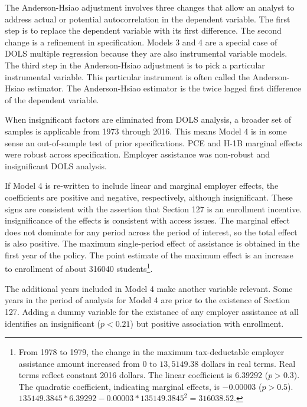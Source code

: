\documentclass[review]{elsarticle}
\begin{document}
The Anderson-Hsiao adjustment involves three changes that allow an analyst to address actual or potential autocorrelation in the dependent variable.
The first step is to replace the dependent variable with its first difference.
The second change is a refinement in specification.
Models 3 and 4 are a special case of DOLS multiple regression because they are also instrumental variable models.
The third step in the Anderson-Hsiao adjustment is to pick a particular instrumental variable.
This particular instrument is often called the Anderson-Hsiao estimator.
The Anderson-Hsiao estimator is the twice lagged first difference of the dependent variable.

When insignificant factors are eliminated from DOLS analysis,
a broader set of samples is applicable from 1973 through 2016.
This means Model 4 is in some sense an out-of-sample test of prior specifications.
PCE and H-1B marginal effects were robust across specification.
Employer assistance was non-robust and insignificant DOLS analysis.

If Model 4 is re-written to include linear and marginal employer effects,
the coefficients are positive and negative, respectively, although insignificant.
These signs are consistent with the assertion that Section 127 is an enrollment incentive.
insignificance of the effects is consistent with access issues.
The marginal effect does not dominate for any period across the period of interest,
so the total effect is also positive.
The maximum single-period effect of assistance is obtained in the first year of the policy.
The point estimate of the maximum effect is an increase to enrollment of about 316040 students\footnote{
    From 1978 to 1979, the change in the maximum tax-deductable employer assistance amount increased from
    0 to $13,5149.38$ dollars in real terms.
    Real terms reflect constant 2016 dollars.
    The linear coefficient is $6.39292$ ($p > 0.3$).
    The quadratic coefficient, indicating marginal effects, is $-0.00003$ ($p > 0.5$).
    $135149.3845*6.39292 - 0.00003*135149.3845^2 = 316038.52$.
}.

The additional years included in Model 4 make another variable relevant.
Some years in the period of analysis for Model 4 are prior to the existence of Section 127.
Adding a dummy variable for the existance of any employer assistance at all
identifies an insignificant ($p < 0.21$) but positive association with enrollment.
\end{document}
